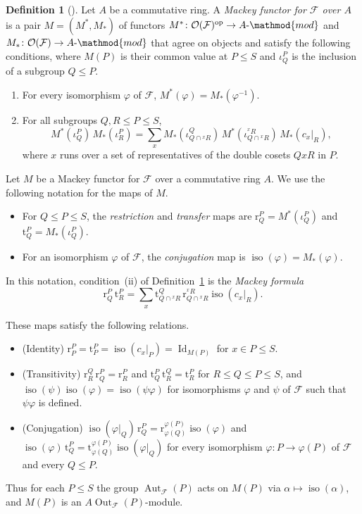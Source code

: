 \documentclass[10pt]{amsart}
\theoremstyle{definition}
\newtheorem{definition}[theorem]{Definition}
\DeclareMathOperator{\Aut}{Aut}
\DeclareMathOperator{\Out}{Out}
\numberwithin{equation}{section}
\renewcommand{\le}{\leqslant}
\newcommand{\F}{\mathcal F}
\newcommand{\Op}{\mathcal O}
\begin{document}
\begin{definition}[{\cite[Definition~2.1]{DP}}]\label{def:mackey}
Let $A$ be a commutative ring. A \emph{Mackey functor for $\F$ over $A$} is a pair $M=(M^*,M_*)$ of functors $M^*\colon\Op(\F)^{\mathrm{op}}\to A\text{-}\mathmod{mod}$ and $M_*\colon\Op(\F)\to A\text{-}\mathmod{mod}$ that agree on objects and satisfy the following conditions, where $M(P)$ is their common value at $P\le S$ and $\iota^P_Q$ is the inclusion of a subgroup $Q\le P$.
\begin{enumerate}[label=\textup{(\roman*)}]
\item For every isomorphism $\varphi$ of $\F$, $M^*(\varphi)=M_*(\varphi^{-1})$.
\item For all subgroups $Q,R\le P\le S$,
\[
M^*(\iota^P_Q)\,M_*(\iota^P_R)=\sum_xM_*(\iota^Q_{Q\cap{}^xR})\,M^*(\iota^{{}^xR}_{Q\cap{}^xR})\,M_*(c_x|_R),
\]
where $x$ runs over a set of representatives of the double cosets $QxR$ in $P$.
\end{enumerate}
\end{definition}

Let $M$ be a Mackey functor for $\F$ over a commutative ring $A$. We use the following notation for the maps of $M$.
\begin{itemize}
\item For $Q\le P\le S$, the \emph{restriction} and \emph{transfer} maps are $\mathrm{r}^P_Q=M^*(\iota^P_Q)$ and $\mathrm{t}^P_Q=M_*(\iota^P_Q)$.
\item For an isomorphism $\varphi$ of $\F$, the \emph{conjugation} map is $\operatorname{iso}(\varphi)=M_*(\varphi)$.
\end{itemize}
In this notation, condition~(ii) of Definition~\ref{def:mackey} is the \emph{Mackey formula}
\begin{equation}\label{eq:mackey}
\mathrm{r}^P_Q\,\mathrm{t}^P_R=\sum_x\mathrm{t}^Q_{Q\cap{}^xR}\,\mathrm{r}^{{}^xR}_{Q\cap{}^xR}\operatorname{iso}(c_x|_R).
\end{equation}

These maps satisfy the following relations.
\begin{itemize}
\item (Identity) $\mathrm{r}^P_P=\mathrm{t}^P_P=\operatorname{iso}(c_x|_P)=\operatorname{Id}_{M(P)}$ for $x\in P\le S$.
\item (Transitivity) $\mathrm{r}^Q_R\,\mathrm{r}^P_Q=\mathrm{r}^P_R$ and $\mathrm{t}^P_Q\,\mathrm{t}^Q_R=\mathrm{t}^P_R$ for $R\le Q\le P\le S$, and $\operatorname{iso}(\psi)\operatorname{iso}(\varphi)=\operatorname{iso}(\psi\varphi)$ for isomorphisms $\varphi$ and $\psi$ of $\F$ such that $\psi\varphi$ is defined.
\item (Conjugation) $\operatorname{iso}(\varphi|_Q)\,\mathrm{r}^P_Q=\mathrm{r}^{\varphi(P)}_{\varphi(Q)}\operatorname{iso}(\varphi)$ and $\operatorname{iso}(\varphi)\,\mathrm{t}^P_Q=\mathrm{t}^{\varphi(P)}_{\varphi(Q)}\operatorname{iso}(\varphi|_Q)$ for every isomorphism $\varphi\colon P\to\varphi(P)$ of $\F$ and every $Q\le P$.
\end{itemize}
Thus for each $P\le S$ the group $\Aut_\F(P)$ acts on $M(P)$ via $\alpha\mapsto\operatorname{iso}(\alpha)$, and $M(P)$ is an $A\Out_\F(P)$\nobreakdash-module.
\end{document}
